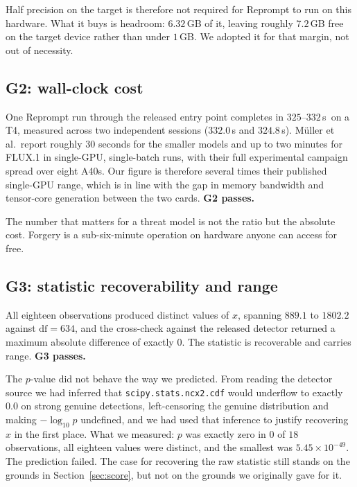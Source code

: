 \documentclass[10pt,twocolumn]{article}
\newcommand{\code}[1]{\texttt{\small #1}}
\newcommand{\reptime}{$325$--$332$\,s}
\newcommand{\xstat}{\ensuremath{x}}
\begin{document}
Half precision on the target is therefore not required for Reprompt to run on this
hardware. What it buys is headroom: $6.32$\,GB of it, leaving roughly $7.2$\,GB free
on the target device rather than under $1$\,GB. We adopted it for that margin, not
out of necessity.

\subsection{G2: wall-clock cost}

One Reprompt run through the released entry point completes in \reptime\ on a T4, measured across two independent sessions ($332.0$\,s and $324.8$\,s).
M\"uller et al.\ report roughly $30$ seconds for the smaller models and up to two
minutes for FLUX.1 in single-GPU, single-batch runs, with their full experimental
campaign spread over eight A40s. Our figure is therefore several times their published
single-GPU range, which is in line with the gap in memory bandwidth and tensor-core
generation between the two cards. \textbf{G2 passes.}

The number that matters for a threat model is not the ratio but the absolute cost.
Forgery is a sub-six-minute operation on hardware anyone can access for free.

\subsection{G3: statistic recoverability and range}
\label{sec:g3}

All eighteen observations produced distinct values of $\xstat$, spanning $889.1$ to
$1802.2$ against $\mathrm{df} = 634$, and the cross-check against the released
detector returned a maximum absolute difference of exactly $0$. The statistic is
recoverable and carries range. \textbf{G3 passes.}

The $p$-value did not behave the way we predicted. From reading the detector source we
had inferred that \code{scipy.stats.ncx2.cdf} would underflow to exactly $0.0$ on
strong genuine detections, left-censoring the genuine distribution and making
$-\log_{10} p$ undefined, and we had used that inference to justify recovering
$\xstat$ in the first place. What we measured: $p$ was exactly zero in $0$ of $18$
observations, all eighteen values were distinct, and the smallest was
$5.45 \times 10^{-49}$. The prediction failed. The case for recovering the raw
statistic still stands on the grounds in Section~\ref{sec:score}, but not on the
grounds we originally gave for it.
\end{document}
